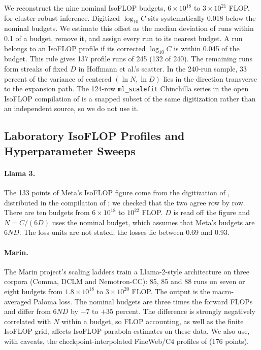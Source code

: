 We reconstruct the nine nominal IsoFLOP budgets, $6\times10^{18}$ to $3\times10^{21}$ FLOP, for cluster-robust inference.
Digitized $\log_{10}C$ sits systematically 0.018 below the nominal budgets. We estimate this offset as the median
deviation of runs within 0.1 of a budget, remove it, and assign every run to its nearest budget. A run belongs to an
IsoFLOP profile if its corrected $\log_{10}C$ is within 0.045 of the budget. This rule gives 137 profile runs of 245
(132 of 240). The remaining runs form streaks of fixed $D$ in Hoffmann et al.'s scatter. In the 240-run sample, 33
percent of the variance of centered $(\ln N,\ln D)$ lies in the direction transverse to the expansion path. The
124-row \texttt{ml\_scalefit} Chinchilla series in the open IsoFLOP compilation of \citet{czech2026problems} is a
snapped subset of the same digitization rather than an independent source, so we do not use it.

\subsection{Laboratory IsoFLOP Profiles and Hyperparameter Sweeps}\label{app:isoflop}

\paragraph{Llama 3.}
The 133 points of Meta's IsoFLOP figure \citep{grattafiori2024llama} come from the digitization of
\citet{czech2026llama3isoflop}, distributed in the compilation of \citet{czech2026problems}; we checked that the two
agree row by row. There are ten budgets from $6\times10^{18}$ to $10^{22}$ FLOP. $D$ is read off the figure and
$N=C/(6D)$ uses the nominal budget, which assumes that Meta's budgets are $6ND$. The loss units are not stated; the
losses lie between 0.69 and 0.93.

\paragraph{Marin.}
The Marin project's scaling ladders \citep{marin2026ladders} train a Llama-2-style architecture on three corpora
(Comma, DCLM and Nemotron-CC): 85, 85 and 88 runs on seven or eight budgets from $1.8\times10^{18}$ to
$3\times10^{20}$ FLOP. The output is the macro-averaged Paloma loss. The nominal budgets are three times the forward
FLOPs and differ from $6ND$ by $-7$ to $+35$ percent. The difference is strongly negatively correlated with $N$ within
a budget, so FLOP accounting, as well as the finite IsoFLOP grid, affects IsoFLOP-parabola estimates on these data.
We also use, with caveats, the checkpoint-interpolated FineWeb/C4 profiles of \citet{li2025misfitting} (176 points).

